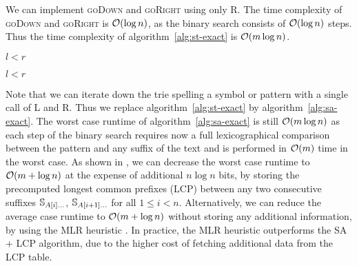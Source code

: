 We can implement \textsc{goDown} and \textsc{goRight} using only \textsc{R}.
The time complexity of \textsc{goDown} and \textsc{goRight} is $\mathcal{O}(\log{n})$, as the binary search consists of $\mathcal{O}(\log{n})$ steps.
Thus the time complexity of algorithm~\ref{alg:st-exact} is $\mathcal{O}(m \log{n})$.

\begin{algorithm}[h!]
\begin{minipage}[t]{.5\textwidth}
\label{alg:sa-godown}
\begin{algorithmic}[1]
		\State \Return \False
	\EndIf
	\EndIf
	\State \Return $l < r$
\EndProcedure
\end{algorithmic}
\end{minipage}
\begin{minipage}[t]{.5\textwidth}
\label{alg:sa-goright}
\begin{algorithmic}[1]
		\State \Return \False
	\EndIf
	\EndIf
	\State \Return $l < r$
\EndProcedure
\end{algorithmic}
\end{minipage}
\end{algorithm}

Note that we can iterate down the trie spelling a symbol or pattern with a single call of \textsc{L} and \textsc{R}.
Thus we replace algorithm~\ref{alg:st-exact} by algorithm~\ref{alg:sa-exact}.
The worst case runtime of algorithm~\ref{alg:sa-exact} is still $\mathcal{O}(m \log{n})$ as each step of the binary search requires now a full lexicographical comparison between the pattern and any suffix of the text and is performed in $\mathcal{O}(m)$ time in the worst case.
As shown in \citep{Manber1990}, we can decrease the worst case runtime to $\mathcal{O}(m + \log{n})$ at the expense of additional $n \log{n}$ bits, by storing the precomputed longest common prefixes (LCP) between any two consecutive suffixes $\mathbb {S}_{A[i] \dots}$, $\mathbb {S}_{A[i+1] \dots}$ for all $1 \leq i < n$.
Alternatively, we can reduce the average case runtime to $\mathcal{O}(m + \log{n})$ without storing any additional information, by using the MLR heuristic \citep{Manber1990}.
In practice, the MLR heuristic outperforms the SA + LCP algorithm, due to the higher cost of fetching additional data from the LCP table.

